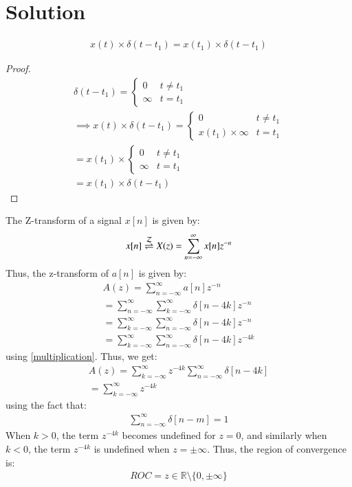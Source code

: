 \documentclass[journal,12pt,twocolumn]{IEEEtran}
\begin{document}
\section{Solution}
\begin{lemma}
\begin{align}
x(t) \times \delta(t-t_1) = x(t_1) \times \delta(t-t_1)
\label{multiplication}
\end{align}
\end{lemma}
\begin{proof}
\begin{align}
\delta(t-t_1) = 
\begin{cases}
0 & t \neq t_1\\
\infty & t=t_1
\end{cases}\\
\implies x(t) \times \delta(t-t_1) = 
\begin{cases}
0 & t \neq t_1\\
x(t_1) \times \infty & t=t_1
\end{cases}\\
 = x(t_1) \times \begin{cases}
0 & t \neq t_1\\
\infty & t=t_1
\end{cases}\\
 = x(t_1)\times \delta(t-t_1)
\end{align}

\end{proof}
The Z-transform of a signal $x[n]$ is given by:
\begin{align}
    x[n] \overset{\mathcal{Z}}{ \rightleftharpoons} X(z) = \sum_{n = -\infty}^\infty x[n] z^{-n}
\end{align}
Thus, the z-transform of $a[n]$ is given by:
\begin{align}
    A(z) = \sum_{n = -\infty}^\infty a[n] z^{-n}\\
     = \sum_{n = -\infty}^\infty \sum_{k = -\infty}^\infty \delta[n-4k] z^{-n}\\
      = \sum_{k = -\infty}^\infty\sum_{n = -\infty}^\infty\delta[n-4k] z^{-n}\\
       = \sum_{k = -\infty}^\infty\sum_{n = -\infty}^\infty\delta[n-4k] z^{-4k}
\end{align}
using \eqref{multiplication}. Thus, we get:
\begin{align}
    A(z) =  \sum_{k = -\infty}^\infty z^{-4k}\sum_{n = -\infty}^\infty\delta[n-4k] \\ 
    = \sum_{k = -\infty}^\infty z^{-4k}
\end{align}
using the fact that:
\begin{align}
    \sum_{n = -\infty}^\infty \delta[n-m] = 1
\end{align}
When $k > 0$, the term $z^{-4k}$ becomes undefined for $z = 0$, and similarly when $k < 0$, the term $z^{-4k}$ is undefined when $z = \pm\infty$. Thus, the region of convergence is:
\begin{align}
    ROC = z \in \mathbb{R} \setminus \{0 , \pm\infty\}
\end{align}
\end{document}
